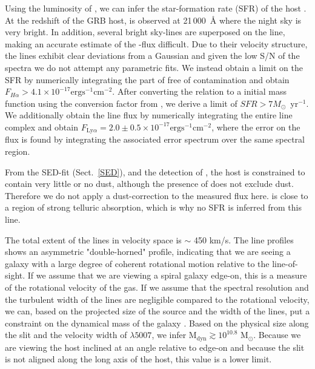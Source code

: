 \documentclass{aa}    %
\begin{document}
Using the luminosity of \ha, we can infer the star-formation rate (SFR) of the
host \citep{Kennicutt1998}. At the redshift of the GRB host, \ha{} is observed
at 21\,000~\AA{} where the night sky is very bright. In addition, several bright
sky-lines are superposed on the line, making an accurate estimate of the
\ha-flux difficult. Due to their velocity structure, the lines exhibit clear
deviations from a Gaussian and given the low S/N of the spectra we do not
attempt any parametric fits. We instead obtain a limit on the SFR by numerically
integrating the part of \ha{} free of contamination and obtain $F_{H \alpha} >
4.1 \times 10^{-17} \mathrm{erg} \mathrm{s}^{-1} \mathrm{cm}^{-2}$. After
converting the \citet{Kennicutt1998} relation to a \citet{Chabrier2003} initial
mass function using the conversion factor from \citet{Madau2014}, we derive a limit of $SFR > 7
M_\odot$~yr$^{-1}$. We additionally obtain the \lya{} line flux by numerically
integrating the entire \lya{} line complex and obtain $F_{\mathrm{Ly}\alpha} =
2.0 \pm 0.5 \times 10^{-17} \mathrm{erg} \mathrm{s}^{-1} \mathrm{cm}^{-2}$,
where the error on the flux is found by integrating the associated error
spectrum over the same spectral region.


From the SED-fit (Sect.~\ref{SED}), and the detection of \lya{}, the host is
constrained to contain very little or no dust, although the presence of \lya{}
does not exclude dust. Therefore we do not apply a dust-correction to the
measured \ha{} flux here. \oii{} is close to a region of strong telluric
absorption, which is why no SFR is inferred from this line.

The total extent of the lines in velocity space is $\sim$ 450 km/s. The line
profiles shows an asymmetric "double-horned" profile, indicating that we are
seeing a galaxy with a large degree of coherent rotational motion relative to
the line-of-sight. If we assume that we are viewing a spiral galaxy edge-on,
this is a measure of the rotational velocity of the gas. If we assume that the
spectral resolution and the turbulent width of the lines are negligible compared
to the rotational velocity, we can, based on the projected size of the source
and the width of the lines, put a constraint on the dynamical mass of the galaxy
\citep{DeBlok2014}. Based on the physical size along the slit and the velocity
width of \oiii$\lambda5007$, we infer M$_\text{dyn} \gtrsim 10^{10.8}$
M$_\odot$. Because we are viewing the host inclined at an angle relative to
edge-on and because the slit is not aligned along the long axis of the host,
this value is a lower limit. 
\end{document}
